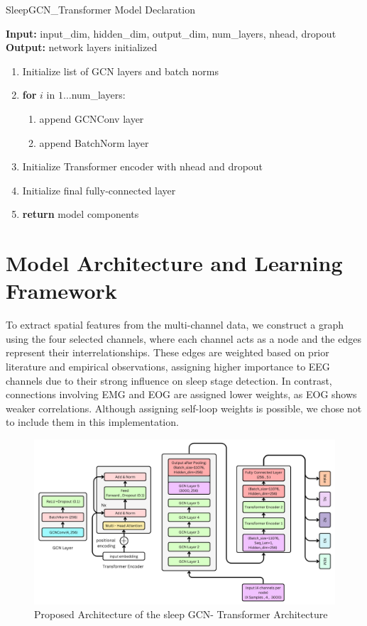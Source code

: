 \begin{algorithm}[H]
	\caption{SleepGCN\_Transformer Model Declaration}
	\label{alg:sleep_gcn_transformer}
	\textbf{Input:} input\_dim, hidden\_dim, output\_dim, num\_layers, nhead, dropout \\
	\textbf{Output:} network layers initialized
	\begin{enumerate}
		\item Initialize list of GCN layers and batch norms
		\item \textbf{for} $i$ in $1\ldots$num\_layers:
		\begin{enumerate}
			\item append GCNConv layer
			\item append BatchNorm layer
		\end{enumerate}
		\item Initialize Transformer encoder with nhead and dropout
		\item Initialize final fully‐connected layer
		\item \textbf{return} model components
	\end{enumerate}
\end{algorithm}








\section{Model Architecture and Learning Framework}

To extract spatial features from the multi-channel data, we construct a graph using the four selected channels, where each channel acts as a node and the edges represent their interrelationships. These edges are weighted based on prior literature and empirical observations, assigning higher importance to EEG channels due to their strong influence on sleep stage detection. In contrast, connections involving EMG and EOG are assigned lower weights, as EOG shows weaker correlations. Although assigning self-loop weights is possible, we chose not to include them in this implementation.


\begin{figure}
	\centering
	\includegraphics[width=.9\linewidth]{"img/paper_3/Graph Convolution Neural Network -SleepGCN_Transformer Architechture"}
	\caption{Proposed Architecture of the sleep GCN- Transformer Architecture}
	\label{fig:graph-convolution-neural-network--sleepgcntransformer-architechture}
\end{figure}

